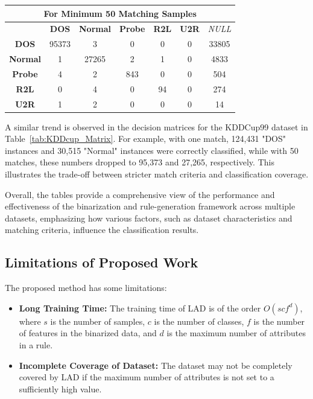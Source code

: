 \documentclass[pdflatex,sn-mathphys-num]{sn-jnl}%
\theoremstyle{thmstyleone}%
\theoremstyle{thmstyletwo}%
\theoremstyle{thmstylethree}%
\begin{document}
\begin{table}[ht!]
  \begin{tabular}{|c|c|c|c|c|c|c|}
    \hline
    \multicolumn{7}{|c|}{\textbf{For Minimum 50 Matching Samples}} \\ \hline
                    & \textbf{DOS} & \textbf{Normal} & \textbf{Probe} & \textbf{R2L} & \textbf{U2R} & \textit{NULL} \\ \hline
    \textbf{DOS}    & 95373        & 3               & 0              & 0            & 0            & 33805         \\ \hline
    \textbf{Normal} & 1            & 27265           & 2              & 1            & 0            & 4833          \\ \hline
    \textbf{Probe}  & 4            & 2               & 843            & 0            & 0            & 504           \\ \hline
    \textbf{R2L}    & 0            & 4               & 0              & 94           & 0            & 274           \\ \hline
    \textbf{U2R}    & 1            & 2               & 0              & 0            & 0            & 14            \\ \hline
  \end{tabular}
\end{table}


A similar trend is observed in the decision matrices for the KDDCup99 dataset in Table~\ref{tab:KDDcup_Matrix}. For example, with one match, 124,431 "DOS" instances and 30,515 "Normal" instances were correctly classified, while with 50 matches, these numbers dropped to 95,373 and 27,265, respectively.
This illustrates the trade-off between stricter match criteria and classification coverage.

Overall, the tables provide a comprehensive view of the performance and effectiveness of the binarization and rule-generation framework across multiple datasets, emphasizing how various factors, such as dataset characteristics and matching criteria, influence the classification results.


\subsection{Limitations of Proposed Work}
The proposed method has some limitations:

\begin{itemize}
  \item \textbf{Long Training Time:} The training time of LAD is of the order \( O(scf^d) \), where \(s\) is the number of samples, \(c\) is the number of classes, \(f\) is the number of features in the binarized data, and \(d\) is the maximum number of attributes in a rule.
  \item \textbf{Incomplete Coverage of Dataset:} The dataset may not be completely covered by LAD if the maximum number of attributes is not set to a sufficiently high value.
\end{itemize}
\end{document}
